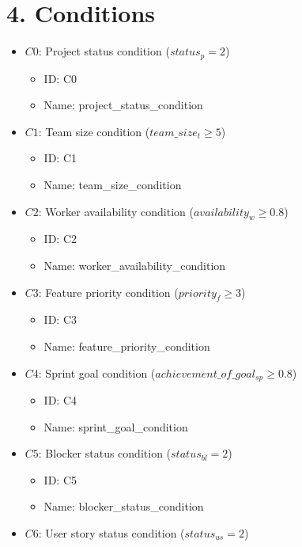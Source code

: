 \documentclass{article}
\begin{document}
\section{4. Conditions}
\begin{itemize}
    \item $C0$: Project status condition ($status_p = 2$)
        \begin{itemize}
            \item ID: C0
            \item Name: project\_status\_condition
        \end{itemize}
    \item $C1$: Team size condition ($team\_size_t \geq 5$)
        \begin{itemize}
            \item ID: C1
            \item Name: team\_size\_condition
        \end{itemize}
    \item $C2$: Worker availability condition ($availability_w \geq 0.8$)
        \begin{itemize}
            \item ID: C2
            \item Name: worker\_availability\_condition
        \end{itemize}
    \item $C3$: Feature priority condition ($priority_f \geq 3$)
        \begin{itemize}
            \item ID: C3
            \item Name: feature\_priority\_condition
        \end{itemize}
    \item $C4$: Sprint goal condition ($achievement\_of\_goal_{sp} \geq 0.8$)
        \begin{itemize}
            \item ID: C4
            \item Name: sprint\_goal\_condition
        \end{itemize}
    \item $C5$: Blocker status condition ($status_{bl} = 2$)
        \begin{itemize}
            \item ID: C5
            \item Name: blocker\_status\_condition
        \end{itemize}
    \item $C6$: User story status condition ($status_{us} = 2$)

\end{itemize}
\end{document}
